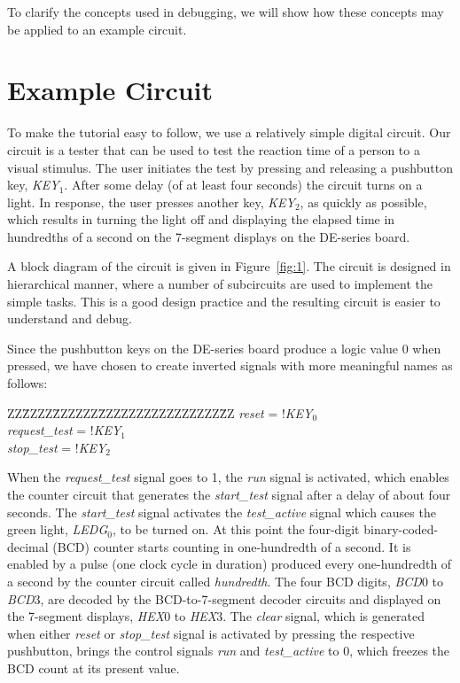 \documentclass[11pt, twoside, pdftex]{article}
\begin{document}
To clarify the concepts used in debugging, we will show how these concepts may be
applied to an example circuit.
 
\section{Example Circuit}
To make the tutorial easy to follow, we use a relatively simple digital circuit.
Our circuit is a tester that can be used to test the reaction time of a person
to a visual stimulus. The user initiates the test by pressing and releasing a pushbutton key, 
{\it KEY}$_1$. After some delay (of at least four seconds) the circuit turns on a light. 
In response, the user presses another key, {\it KEY}$_2$, as quickly as possible, which 
results in turning the light off and displaying the elapsed time in
hundredths of a second on the 7-segment displays on the DE-series board.

A block diagram of the circuit is given in Figure~\ref{fig:1}. The circuit is designed in
hierarchical manner, where a number of subcircuits are used to implement the simple tasks.
This is a good design practice and the resulting circuit is easier to understand and debug.

Since the pushbutton keys on the DE-series board produce a logic value 0 when pressed, 
we have chosen to create inverted signals with more meaningful names as follows:
\begin{center} %
\parbox{12.5cm}{
\begin{tabbing}
ZZ\=ZZZZ\=ZZZZZZ\=ZZZZZZZZZZZZZZZZ\=ZZ\kill
{\it reset} = !{\it KEY}$_0$\\
{\it request\_test} = !{\it KEY}$_1$ \\
{\it stop\_test} = !{\it KEY}$_2$
\end{tabbing} } %
\end{center}

\noindent
When the {\it request\_test} signal goes to 1, the {\it run} signal is activated,
which enables the counter circuit that generates the {\it start\_test} signal
after a delay of about four seconds. The {\it start\_test} signal activates the
{\it test\_active} signal which causes the green light, {\it LEDG}$_0$, 
to be turned on. At this point the four-digit binary-coded-decimal (BCD) counter
starts counting in one-hundredth of a second. It is enabled by a pulse (one clock 
cycle in duration) produced every one-hundredth of a second by the counter circuit
called {\it hundredth}. The four BCD digits, {\it BCD}0 to {\it BCD}3, are 
decoded by the BCD-to-7-segment decoder circuits and displayed on the 7-segment 
displays, {\it HEX}0 to {\it HEX}3. The {\it clear} signal, which is generated when 
either {\it reset} or {\it stop\_test} signal is activated by pressing the respective 
pushbutton, brings the control signals {\it run} and {\it test\_active} to 0, 
which freezes the BCD count at its present value.
\end{document}
